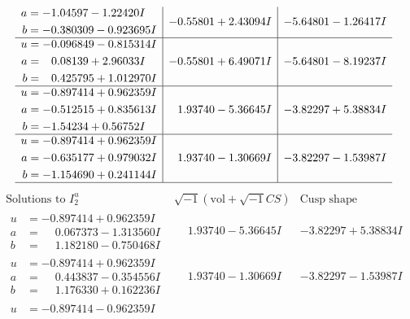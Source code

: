\documentclass[1p]{elsarticle_modified}
\theoremstyle{definition}
\newcommand{\I}{\sqrt{-1}}
\begin{document}
$$\begin{array}{c|c|c}
\begin{aligned}
a &= -1.04597 - 1.22420 I \\
b &= -0.380309 - 0.923695 I\end{aligned}
 & -0.55801 + 2.43094 I & -5.64801 - 1.26417 I \\ \hline\begin{aligned}
u &= -0.096849 - 0.815314 I \\
a &= \phantom{-}0.08139 + 2.96033 I \\
b &= \phantom{-}0.425795 + 1.012970 I\end{aligned}
 & -0.55801 + 6.49071 I & -5.64801 - 8.19237 I \\ \hline\begin{aligned}
u &= -0.897414 + 0.962359 I \\
a &= -0.512515 + 0.835613 I \\
b &= -1.54234 + 0.56752 I\end{aligned}
 & \phantom{-}1.93740 - 5.36645 I & -3.82297 + 5.38834 I \\ \hline\begin{aligned}
u &= -0.897414 + 0.962359 I \\
a &= -0.635177 + 0.979032 I \\
b &= -1.154690 + 0.241144 I\end{aligned}
 & \phantom{-}1.93740 - 1.30669 I & -3.82297 - 1.53987 I\\
 \hline 
 \end{array}$$\newpage$$\begin{array}{c|c|c}  
\text{Solutions to }I^u_{2}& \I (\text{vol} + \sqrt{-1}CS) & \text{Cusp shape}\\
 \hline 
\begin{aligned}
u &= -0.897414 + 0.962359 I \\
a &= \phantom{-}0.067373 - 1.313560 I \\
b &= \phantom{-}1.182180 - 0.750468 I\end{aligned}
 & \phantom{-}1.93740 - 5.36645 I & -3.82297 + 5.38834 I \\ \hline\begin{aligned}
u &= -0.897414 + 0.962359 I \\
a &= \phantom{-}0.443837 - 0.354556 I \\
b &= \phantom{-}1.176330 + 0.162236 I\end{aligned}
 & \phantom{-}1.93740 - 1.30669 I & -3.82297 - 1.53987 I \\ \hline\begin{aligned}
u &= -0.897414 - 0.962359 I \\

\end{aligned}
\end{array}$$
\end{document}
